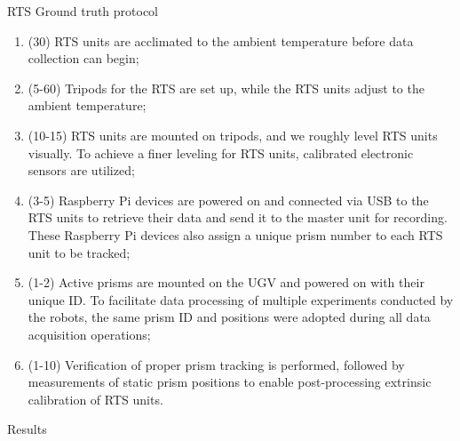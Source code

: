 \documentclass[final,hyperref={pdfpagelabels=false}]{beamer}
\begin{document}
\begin{frame}[t]
\begin{columns}[t]
\begin{column}{.465\textwidth}
\vspace{-12.5mm}
\begin{block}{RTS Ground truth protocol}
    \begin{enumerate}
        \item (\SI{30}{\min}) \ac{RTS} units are acclimated to the ambient temperature before data collection can begin;
        \item (\num{5}-\SI{60}{\min}) Tripods for the \ac{RTS} are set up, while the \ac{RTS} units adjust to the ambient temperature;
        \item (\num{10}-\SI{15}{\min}) \ac{RTS} units are mounted on tripods, and we roughly level \ac{RTS} units visually.
        To achieve a finer leveling for \ac{RTS} units, calibrated electronic sensors are utilized;
        \item (\num{3}-\SI{5}{\min}) Raspberry Pi devices are powered on and connected via USB to the \ac{RTS} units to retrieve their data and send it to the master unit for recording. 
        These Raspberry Pi devices also assign a unique prism number to each \ac{RTS} unit to be tracked;
        \item (\num{1}-\SI{2}{\min}) Active prisms are mounted on the \ac{UGV} and powered on with their unique ID.
        To facilitate data processing of multiple experiments conducted by the robots, the same prism ID and positions were adopted during all data acquisition operations;
        \item (\num{1}-\SI{10}{\min}) Verification of proper prism tracking is performed, followed by measurements of static prism positions to enable post-processing extrinsic calibration of \ac{RTS} units.
    \end{enumerate}
\end{block}


\begin{block}{Results}
	

\end{block}
\end{column}
\end{columns}
\end{frame}
\end{document}
